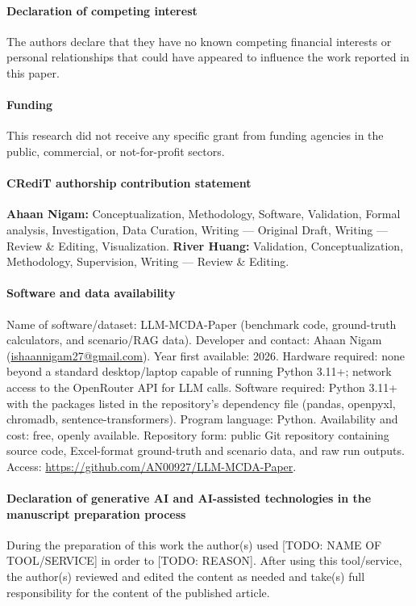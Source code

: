 \documentclass[final,3p,times]{elsarticle}
\begin{document}
\clearpage

\paragraph*{Declaration of competing interest}
The authors declare that they have no known competing financial interests or personal relationships that could have appeared to influence the work reported in this paper.

\paragraph*{Funding}
This research did not receive any specific grant from funding agencies in the public, commercial, or not-for-profit sectors.

\paragraph*{CRediT authorship contribution statement}
\textbf{Ahaan Nigam:} Conceptualization, Methodology, Software, Validation, Formal analysis, Investigation, Data Curation, Writing --- Original Draft, Writing --- Review \& Editing, Visualization. \textbf{River Huang:} Validation, Conceptualization, Methodology, Supervision, Writing --- Review \& Editing.

\paragraph*{Software and data availability}
Name of software/dataset: LLM-MCDA-Paper (benchmark code, ground-truth calculators, and scenario/RAG data). Developer and contact: Ahaan Nigam (\href{mailto:ishaannigam27@gmail.com}{ishaannigam27@gmail.com}). Year first available: 2026. Hardware required: none beyond a standard desktop/laptop capable of running Python 3.11+; network access to the OpenRouter API for LLM calls. Software required: Python 3.11+ with the packages listed in the repository's dependency file (pandas, openpyxl, chromadb, sentence-transformers). Program language: Python. Availability and cost: free, openly available. Repository form: public Git repository containing source code, Excel-format ground-truth and scenario data, and raw run outputs. Access: \url{https://github.com/AN00927/LLM-MCDA-Paper}.

\paragraph*{Declaration of generative AI and AI-assisted technologies in the manuscript preparation process}
During the preparation of this work the author(s) used [TODO: NAME OF TOOL/SERVICE] in order to [TODO: REASON]. After using this tool/service, the author(s) reviewed and edited the content as needed and take(s) full responsibility for the content of the published article.
\end{document}
